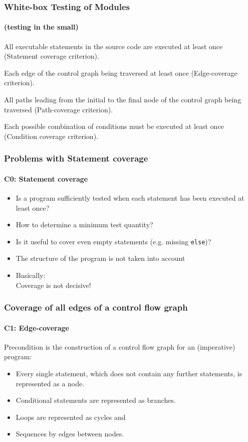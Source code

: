 

\begin{frame}
\frametitle{White-box Testing of Modules}
\framesubtitle{(testing in the small)}
\begin{description}[Anwei]
  \item[C0: Statement Coverage:] All executable statements in the source code are executed at least once (Statement coverage criterion).
  \item[C1: Edge coverage:] Each edge of the control graph being traversed at least once (Edge-coverage criterion).
  \item[C2: Path (Branch) Coverage:] All paths leading from the initial to the final node of the control graph being traversed (Path-coverage criterion).
  \item[C3: (Compound) Condition Coverage:] Each possible combination of conditions must be executed at least once (Condition coverage criterion).
\end{description}
\end{frame}


\begin{frame}
\frametitle{Problems with Statement coverage}
\framesubtitle{C0: Statement coverage}
\begin{itemize}
  \item Is a program sufficiently tested when each statement has been executed at least once?
  \item How to determine a minimum test quantity? 
  \item Is it useful to cover even empty statements (e.g. missing \texttt{else})? 
  \item The structure of the program is not taken into account 
  \item Basically:\\
        Coverage is not decisive!
\end{itemize}
\end{frame}


\begin{frame}
\frametitle{Coverage of all edges of a control flow graph}
\framesubtitle{C1: Edge-coverage}
Precondition is the construction of a control flow graph for an (imperative) program:
\begin{itemize}
  \item Every single statement, which does not contain any further statements, is represented as a node.
  \item Conditional statements are represented as branches.
  \item Loops are represented as cycles and 
  \item Sequences by edges between nodes.
\end{itemize}
\end{frame}

